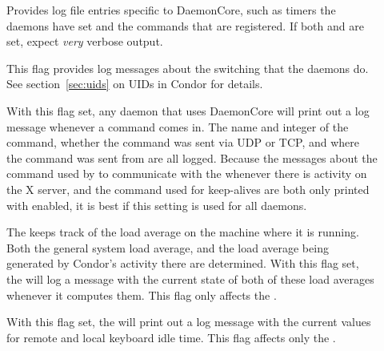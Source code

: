 \begin{description}
\begin{description}
  \item[] \label{dflag:daemoncore} 
    Provides log
    file entries specific to DaemonCore, such as
    timers the daemons have set and the commands that are registered.
    If both  and  are set,
    expect \emph{very} verbose output.

  \item[] \label{dflag:priv}
    This flag provides log
    messages about the  switching that the daemons
    do.  See section~\ref{sec:uids} on UIDs in Condor for details.

  \item[] \label{dflag:command}
    With this flag set, any
    daemon that uses DaemonCore will print out a log message
    whenever a command comes in.  The name and integer of the command,
    whether the command was sent via UDP or TCP, and where
    the command was sent from are all logged.  
    Because the messages about the command used by  to
    communicate with the  whenever there is activity on
    the X server, and the command used for keep-alives are both only
    printed with  enabled, it is best if this setting
    is used for all daemons.

  \item[] \label{dflag:load}
    The  keeps track
    of the load average on the machine where it is running.  Both the
    general system load average, and the load average being generated by
    Condor's activity there are determined.
    With this flag set, the 
    will log a message with the current state of both of these
    load averages whenever it computes them.  This flag only affects the
    .

  \item[] \label{dflag:keyboard} 
    With this flag set, the  will print out a log message
    with the current values for remote and local keyboard idle time.
    This flag affects only the .


\end{description}
\end{description}
